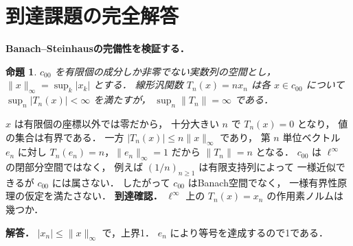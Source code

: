 \documentclass[a5paper,10pt,onecolumn]{jsarticle}
\makeatletter
\theoremstyle{mathnotetheorem}
\newtheorem{proposition}[theorem]{命題}
\renewcommand{\proofname}{証明}
\renewenvironment{proof}[1][\proofname]{%
  \par\pushQED{\qed}\normalfont\topsep4\p@\@plus2\p@\relax
  \trivlist\item[\hskip\labelsep\bfseries #1]\ignorespaces
}{\popQED\endtrivlist\@endpefalse}
\makeatother
\begin{document}
\section{到達課題の完全解答}
\noindent\textbf{Banach--Steinhausの完備性を検証する．}
\begin{proposition}
$c_{00}$ を有限個の成分しか非零でない実数列の空間とし，
$\|x\|_\infty=\sup_k|x_k|$ とする．
線形汎関数 $T_n(x)=nx_n$ は各 $x\in c_{00}$ について
$\sup_n|T_n(x)|<\infty$ を満たすが，
$\sup_n\|T_n\|=\infty$ である．
\end{proposition}
\begin{proof}
$x$ は有限個の座標以外では零だから，
十分大きい $n$ で $T_n(x)=0$ となり，
値の集合は有界である．
一方 $|T_n(x)|\le n\|x\|_\infty$ であり，
第 $n$ 単位ベクトル $e_n$ に対し
$T_n(e_n)=n$，$\|e_n\|_\infty=1$ だから
$\|T_n\|=n$ となる．
$c_{00}$ は $\ell^\infty$ の閉部分空間ではなく，
例えば $(1/n)_{n\ge1}$ は有限支持列によって
一様近似できるが $c_{00}$ には属さない．
したがって $c_{00}$ はBanach空間でなく，
一様有界性原理の仮定を満たさない．
\end{proof}
\noindent\textbf{到達確認．}
$\ell^\infty$ 上の $T_n(x)=x_n$ の作用素ノルムは幾つか．
\par\noindent\textbf{解答．}
$|x_n|\le\|x\|_\infty$ で，上界1．
$e_n$ により等号を達成するので1である．
\end{document}
